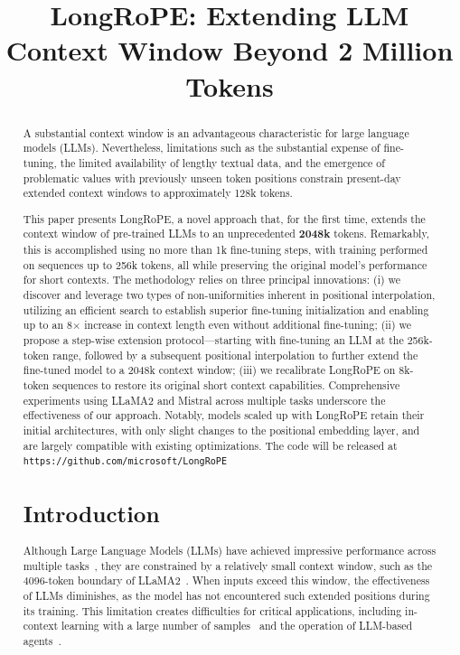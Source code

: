 \title{LongRoPE: Extending LLM Context Window Beyond 2 Million Tokens}

\begin{abstract}
A substantial context window is an advantageous characteristic for large language models (LLMs). Nevertheless, limitations such as the substantial expense of fine-tuning, the limited availability of lengthy textual data, and the emergence of problematic values with previously unseen token positions constrain present-day extended context windows to approximately 128k tokens.

This paper presents LongRoPE, a novel approach that, for the first time, extends the context window of pre-trained LLMs to an unprecedented \textbf{2048k} tokens. Remarkably, this is accomplished using no more than 1k fine-tuning steps, with training performed on sequences up to 256k tokens, all while preserving the original model’s performance for short contexts. The methodology relies on three principal innovations: (i) we discover and leverage two types of non-uniformities inherent in positional interpolation, utilizing an efficient search to establish superior fine-tuning initialization and enabling up to an 8$\times$ increase in context length even without additional fine-tuning; (ii) we propose a step-wise extension protocol—starting with fine-tuning an LLM at the 256k-token range, followed by a subsequent positional interpolation to further extend the fine-tuned model to a 2048k context window; (iii) we recalibrate LongRoPE on 8k-token sequences to restore its original short context capabilities. Comprehensive experiments using LLaMA2 and Mistral across multiple tasks underscore the effectiveness of our approach. Notably, models scaled up with LongRoPE retain their initial architectures, with only slight changes to the positional embedding layer, and are largely compatible with existing optimizations. The code will be released at \texttt{https://github.com/microsoft/LongRoPE}

\section{Introduction}

Although Large Language Models (LLMs) have achieved impressive performance across multiple tasks~\cite{gpt4,llama2}, they are constrained by a relatively small context window, such as the 4096-token boundary of LLaMA2~\cite{llama2}. When inputs exceed this window, the effectiveness of LLMs diminishes, as the model has not encountered such extended positions during its training. This limitation creates difficulties for critical applications, including in-context learning with a large number of samples~\cite{Huang2023FewerIM} and the operation of LLM-based agents~\cite{park2023generative,madaan2023selfrefine}.


\end{abstract}
